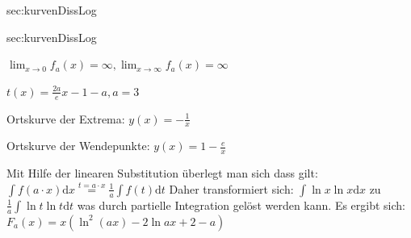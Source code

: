 \documentclass[../Mathe_Aufgaben.tex]{subfiles}
\begin{document}
\begin{loesungssektion}{sec:kurvenDissLog}
\begin{komplexloesungen}{sec:kurvenDissLog}
{\begin{minipage}[t]{\linewidth}
\begin{tikzpicture}
				\end{tikzpicture}
			\end{minipage}
		\item $\lim_{x\to 0}f_a(x)=\infty, \lim_{x\to \infty}f_a(x)=\infty$
		\item $t(x)=\frac{2a}{e}x-1-a,a=3$
		\item Ortskurve der Extrema: $y(x)=-\frac{1}{x}$
		\item Ortskurve der Wendepunkte: $y(x)=1-\frac{e}{x}$
		\item Mit Hilfe der linearen Substitution überlegt man sich dass gilt: \newline $\int f(a\cdot x) \mathrm{d}x \overset{t=a\cdot x}{=} \frac{1}{a}\int f(t) \mathrm{d}t $
		Daher transformiert sich: $\int \ln x \ln x\mathrm{d}x$ zu $\frac{1}{a}\int \ln t \ln t\mathrm{d}t$ was durch partielle Integration gelöst werden kann. Es ergibt sich: $F_a(x)=x\left(\ln^2(ax)-2\ln ax+2-a\right)$ 
	}	
		
	\end{komplexloesungen}
\end{loesungssektion}
\end{document}
